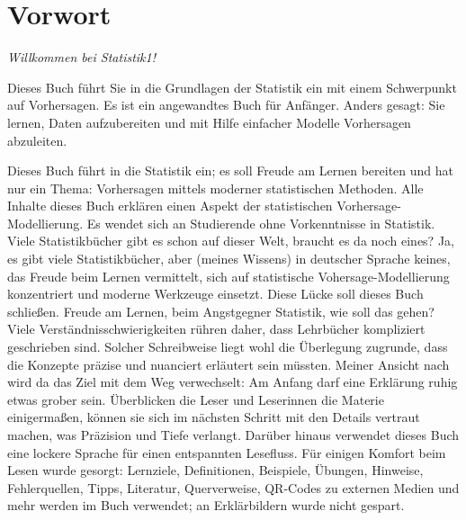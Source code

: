 \documentclass[
  letterpaper,
  twoside,
  open=any]{scrbook}
\theoremstyle{definition}
\theoremstyle{definition}
\theoremstyle{definition}
\theoremstyle{remark}
\begin{document}


\mainmatter
{}

\chapter*{Vorwort}\label{vorwort}


\setcounter{page}{7}

\emph{Willkommen bei Statistik1!}

Dieses Buch führt Sie in die Grundlagen der Statistik ein mit einem
Schwerpunkt auf Vorhersagen. Es ist ein angewandtes Buch für Anfänger.
Anders gesagt: Sie lernen, Daten aufzubereiten und mit Hilfe einfacher
Modelle Vorhersagen abzuleiten.

Dieses Buch führt in die Statistik ein; es soll Freude am Lernen
bereiten und hat nur ein Thema: Vorhersagen mittels moderner
statistischen Methoden. Alle Inhalte dieses Buch erklären einen Aspekt
der statistischen Vorhersage-Modellierung. Es wendet sich an Studierende
ohne Vorkenntnisse in Statistik. Viele Statistikbücher gibt es schon auf
dieser Welt, braucht es da noch eines? Ja, es gibt viele
Statistikbücher, aber (meines Wissens) in deutscher Sprache keines, das
Freude beim Lernen vermittelt, sich auf statistische
Vohersage-Modellierung konzentriert und moderne Werkzeuge einsetzt.
Diese Lücke soll dieses Buch schließen. Freude am Lernen, beim
Angstgegner Statistik, wie soll das gehen? Viele
Verständnisschwierigkeiten rühren daher, dass Lehrbücher kompliziert
geschrieben sind. Solcher Schreibweise liegt wohl die Überlegung
zugrunde, dass die Konzepte präzise und nuanciert erläutert sein
müssten. Meiner Ansicht nach wird da das Ziel mit dem Weg verwechselt:
Am Anfang darf eine Erklärung ruhig etwas grober sein. Überblicken die
Leser und Leserinnen die Materie einigermaßen, können sie sich im
nächsten Schritt mit den Details vertraut machen, was Präzision und
Tiefe verlangt. Darüber hinaus verwendet dieses Buch eine lockere
Sprache für einen entspannten Lesefluss. Für einigen Komfort beim Lesen
wurde gesorgt: Lernziele, Definitionen, Beispiele, Übungen, Hinweise,
Fehlerquellen, Tipps, Literatur, Querverweise, QR-Codes zu externen
Medien und mehr werden im Buch verwendet; an Erklärbildern wurde nicht
gespart.
\end{document}

